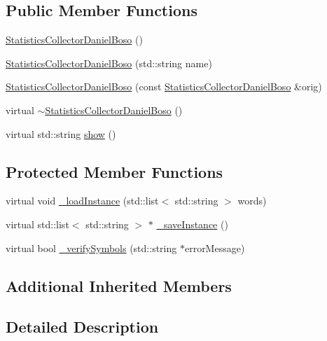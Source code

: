 \subsection*{Public Member Functions}
\begin{DoxyCompactItemize}
\item 
\hyperlink{class_statistics_collector_daniel_boso_a96eb47e05edded053b089e3868d5063f}{Statistics\-Collector\-Daniel\-Boso} ()
\item 
\hyperlink{class_statistics_collector_daniel_boso_a1ea8045195c08561568ab07da5f55f37}{Statistics\-Collector\-Daniel\-Boso} (std\-::string name)
\item 
\hyperlink{class_statistics_collector_daniel_boso_a471bbe58eac1aacb8d05110d401fc3f1}{Statistics\-Collector\-Daniel\-Boso} (const \hyperlink{class_statistics_collector_daniel_boso}{Statistics\-Collector\-Daniel\-Boso} \&orig)
\item 
virtual \hyperlink{class_statistics_collector_daniel_boso_a801c3c7aeeb40473df451581ab46740e}{$\sim$\-Statistics\-Collector\-Daniel\-Boso} ()
\item 
virtual std\-::string \hyperlink{class_statistics_collector_daniel_boso_a38d1fe032f94a4626eb997ae75c04e74}{show} ()
\end{DoxyCompactItemize}
\subsection*{Protected Member Functions}
\begin{DoxyCompactItemize}
\item 
virtual void \hyperlink{class_statistics_collector_daniel_boso_a3e0da5b34a5d74dc84a5ee8b31dbb2d1}{\-\_\-load\-Instance} (std\-::list$<$ std\-::string $>$ words)
\item 
virtual std\-::list$<$ std\-::string $>$ $\ast$ \hyperlink{class_statistics_collector_daniel_boso_a652925edd6ba5b89092a425ba98fc263}{\-\_\-save\-Instance} ()
\item 
virtual bool \hyperlink{class_statistics_collector_daniel_boso_a8095684c74f5ea4f622ed939b518d3b3}{\-\_\-verify\-Symbols} (std\-::string $\ast$error\-Message)
\end{DoxyCompactItemize}
\subsection*{Additional Inherited Members}


\subsection{Detailed Description}


